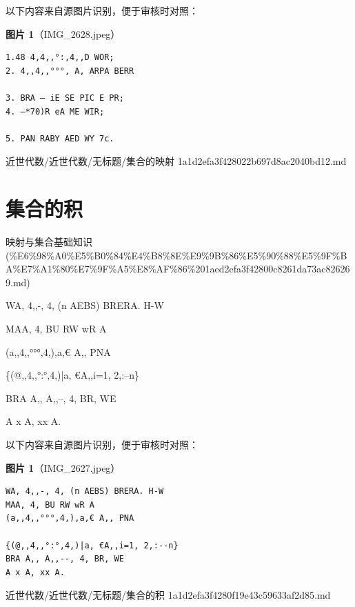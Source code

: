 \begin{note}
以下内容来自源图片识别，便于审核时对照：

\textbf{图片 1}（IMG\_2628.jpeg）
\begin{Verbatim}[fontsize=\small]
1.48 4,4,,°:,4,,D WOR;
2. 4,,4,,°°°, A, ARPA BERR

3. BRA — iE SE PIC E PR;
4. —*70)R eA ME WIR;

5. PAN RABY AED WY 7c.
\end{Verbatim}

\end{note}

\begin{note}[来源路径]

近世代数/近世代数/无标题/集合的映射 1a1d2efa3f428022b697d8ac2040bd12.md

\end{note}

\section*{集合的积}

\begin{note}[来源上级主题]

映射与集合基础知识 (\%E6\%98\%A0\%E5\%B0\%84\%E4\%B8\%8E\%E9\%9B\%86\%E5\%90\%88\%E5\%9F\%BA\%E7\%A1\%80\%E7\%9F\%A5\%E8\%AF\%86\%201aed2efa3f42800c8261da73ac826269.md)

\end{note}

\begin{note}[集合的积]

WA, 4,,-, 4, (n AEBS) BRERA. H-W

MAA, 4, BU RW wR A

(a,,4,,°°°,4,),a,€ A,, PNA

\{(@,,4,,°:°,4,)|a, €A,,i=1, 2,:--n\}

BRA A,, A,,--, 4, BR, WE

A x A, xx A.

\end{note}

\begin{note}
以下内容来自源图片识别，便于审核时对照：

\textbf{图片 1}（IMG\_2627.jpeg）
\begin{Verbatim}[fontsize=\small]
WA, 4,,-, 4, (n AEBS) BRERA. H-W
MAA, 4, BU RW wR A
(a,,4,,°°°,4,),a,€ A,, PNA

{(@,,4,,°:°,4,)|a, €A,,i=1, 2,:--n}
BRA A,, A,,--, 4, BR, WE
A x A, xx A.
\end{Verbatim}

\end{note}

\begin{note}[来源路径]

近世代数/近世代数/无标题/集合的积 1a1d2efa3f4280f19e43c59633af2d85.md

\end{note}
